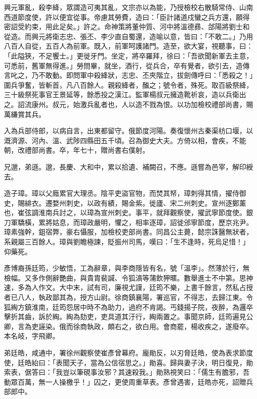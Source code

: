 \begin{pinyinscope}
 興元軍亂，殺李絳，眾謂造可夷其亂，文宗亦以為能，乃授檢校右散騎常侍、山南西道節度使，許以便宜從事。帝慮其勞費，造曰：「臣計諸道戍蠻之兵方還，願得密詔受約束，用此足矣。」許之。命神策將董仲質、河中將溫德彞、郃陽將劉士和從造。而興元將衛志忠、張丕、李少直自蜀還，造喻以意，皆曰：「不敢二。」乃用八百人自從，五百人為前軍。既入，前軍呵護諸門。造至，欲大宴，視聽事，曰：「此隘狹，不足饗士。」更徙牙門。坐定，將卒羅拜，徐曰：「吾欲聞新軍去主意，可悉前，舊軍無得進。」勞問畢，就坐，酒行，從兵合，卒有覺者，欲引去，造傳言叱之，乃不敢動。即問軍中殺絳狀，志忠、丕夾階立，拔劍傳呼曰：「悉殺之！」圍兵爭奮，皆斬首，凡八百餘人。親殺絳者，醢之；號令者，殊死。取百級祭絳，三十級祭死事官王景延等，餘悉投之漢江。監軍楊叔元擁造靴祈哀，造以兵衛出之。詔流康州。叔元，始激兵亂者也，人以造不戮為恨。以功加檢校禮部尚書，賜萬縑賞其兵。



 入為兵部侍郎，以病自言，出東都留守。俄節度河陽。奏復懷州古秦渠枋口堰，以溉濟源、河內、溫、武陟四縣田五千頃。召為御史大夫。方倚以相，會疾，不能朝，改禮部尚書。卒，年七十，贈尚書右僕射。



 兄邈，弟遜。邈，長慶、大和中，累以拾遺、補闕召，不應。遜嘗為邑宰，解印綬去。



 造子璋。璋以父廕累官大理丞。陰平吏盜官物，而焚其帑，璋刺得其情，擢侍御史，賜緋衣。遷婺州刺史，以政有績，賜金紫。徙廬、宋二州刺史。宣州逐鄭薰也，崔弦調淮南兵討之，以璋為宣州刺史。事平，就拜觀察使，擢武寧節度使。銀刀軍驕橫，累將姑息，而璋政嚴明，懼之，相率逐璋，詔徙邠寧節度，歷京兆尹。璋素強幹，鉏宿弊，豪右懾服，加檢校吏部尚書。同昌公主薨，懿宗誅醫無狀者，系親屬三百餘人。璋與劉瞻極諫，貶振州司馬，嘆曰：「生不逢時，死烏足惜！」仰藥死。



 彥博裔孫廷筠，少敏悟，工為辭章，與李商隱皆有名，號「溫李」。然薄於行，無檢幅。又多作側辭艷曲，與貴胄裴諴、令狐滈等蒲飲狎暱。數舉進士不中第。思神速，多為人作文。大中末，試有司，廉視尤謹，廷筠不樂，上書千餘言，然私占授者已八人，執政鄙其為，授方山尉。徐商鎮襄陽，署巡官，不得志，去歸江東。令狐綯方鎮淮南，廷筠怨居中時不為助力，過府不肯謁。丐錢揚子院，夜醉，為邏卒擊折其齒，訴於綯。綯為劾吏，吏具道其汙行，綯兩置之。事聞京師，廷筠遍見公卿，言為吏誣染。俄而徐商執政，頗右之，欲白用。會商罷，楊收疾之，遂廢卒。本名岐，字飛卿。



 弟廷皓，咸通中，署徐州觀察使崔彥曾幕府。龐勛反，以刃脅廷皓，使為表求節度使，廷皓紿曰：「表聞天子，當為公信宿思之。」勛喜。歸與妻子決，明日復見，勛索表，倨答曰：「我豈以筆硯事汝邪？其速殺我。」勛熟視笑曰：「儒生有膽邪，吾動眾百萬，無一人操檄乎！」囚之，更使周重草表。彥曾遇害，廷皓亦死，詔贈兵部郎中。




\end{pinyinscope}
